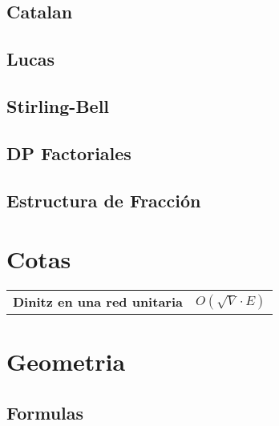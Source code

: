 \documentclass[a4paper,11pt,landscape,twocolumn]{article}
\begin{document}
\subsection{Catalan}



\subsection{Lucas}



\subsection{Stirling-Bell}



\subsection{DP Factoriales}



\subsection{Estructura de Fracción}



\section{Cotas}

\begin{tabular}{p{} p{}}
  \textbf{Dinitz en una red unitaria} & $O(\sqrt{V}\cdot E)$ \\
\end{tabular}

\section{Geometria}

\subsection{Formulas}
\end{document}
